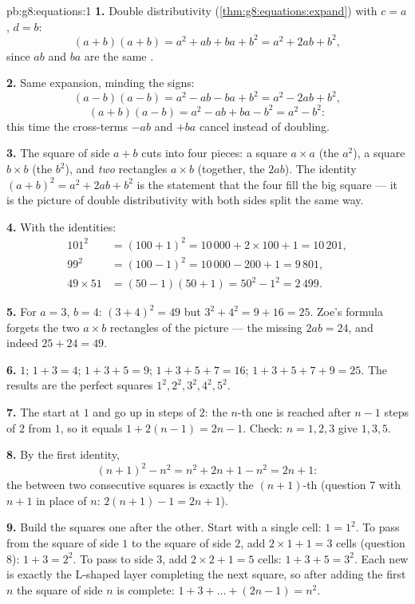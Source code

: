 \begin{solution}{pb:g8:equations:1}
\textbf{1.} Double distributivity
(\cref{thm:g8:equations:expand}) with $c = a$, $d = b$:
\[
(a + b)(a + b) = a^2 + ab + ba + b^2 = a^2 + 2ab + b^2 ,
\]
since $ab$ and $ba$ are the same .

\textbf{2.} Same expansion, minding the signs:
\[
(a - b)(a - b) = a^2 - ab - ba + b^2 = a^2 - 2ab + b^2 ,
\]
\[
(a + b)(a - b) = a^2 - ab + ba - b^2 = a^2 - b^2 :
\]
this time the cross-terms $-ab$ and $+ba$ cancel instead of
doubling.

\textbf{3.} The square of side $a + b$ cuts into four pieces: a
square $a \times a$ (the $a^2$), a square $b \times b$ (the
$b^2$), and \emph{two} rectangles $a \times b$ (together, the
$2ab$). The identity $(a+b)^2 = a^2 + 2ab + b^2$ is the statement
that the four  fill the big square --- it is the picture of
double distributivity with both sides split the same way.

\textbf{4.} With the identities:
\begin{align*}
101^2 &= (100 + 1)^2 = 10\,000 + 2 \times 100 + 1 = 10\,201, \\
99^2 &= (100 - 1)^2 = 10\,000 - 200 + 1 = 9\,801, \\
49 \times 51 &= (50 - 1)(50 + 1) = 50^2 - 1^2 = 2\,499 .
\end{align*}

\textbf{5.} For $a = 3$, $b = 4$: $(3 + 4)^2 = 49$ but
$3^2 + 4^2 = 9 + 16 = 25$. Zoe's formula forgets the two
$a \times b$ rectangles of the picture --- the missing
$2ab = 24$, and indeed $25 + 24 = 49$.

\textbf{6.} $1$; $1 + 3 = 4$; $1 + 3 + 5 = 9$;
$1 + 3 + 5 + 7 = 16$; $1 + 3 + 5 + 7 + 9 = 25$. The results are
the perfect squares $1^2, 2^2, 3^2, 4^2, 5^2$.

\textbf{7.} The  start at $1$ and go up in steps of
$2$: the $n$-th one is reached after $n - 1$ steps of $2$ from
$1$, so it equals $1 + 2(n - 1) = 2n - 1$. Check: $n = 1, 2, 3$
give $1, 3, 5$.

\textbf{8.} By the first identity,
\[
(n + 1)^2 - n^2 = n^2 + 2n + 1 - n^2 = 2n + 1 :
\]
the  between two consecutive squares is exactly the
$(n+1)$-th  (question 7 with $n + 1$ in place of $n$:
$2(n+1) - 1 = 2n + 1$).

\textbf{9.} Build the squares one after the other. Start with a
single cell: $1 = 1^2$. To pass from the square of side $1$ to
the square of side $2$, add $2 \times 1 + 1 = 3$ cells (question
8): $1 + 3 = 2^2$. To pass to side $3$, add $2 \times 2 + 1 = 5$
cells: $1 + 3 + 5 = 3^2$. Each new  is exactly the
L-shaped layer completing the next square, so after adding the
first $n$  the square of side $n$ is complete:
$1 + 3 + \dots + (2n - 1) = n^2$.


\end{solution}
